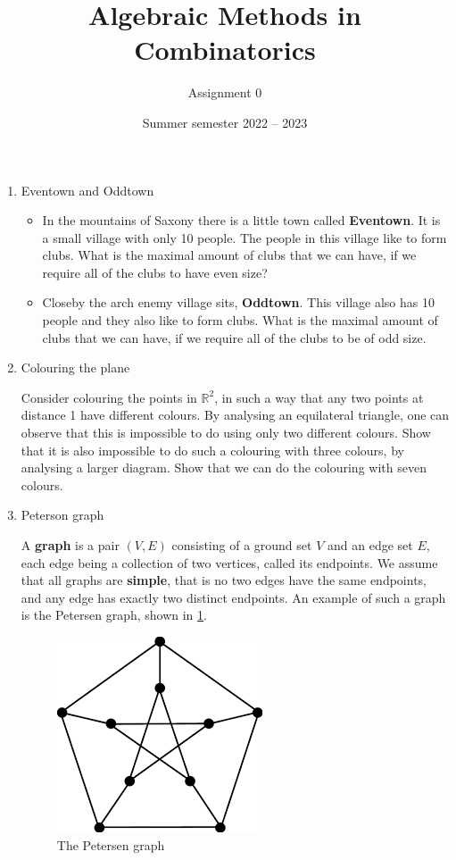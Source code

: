 \documentclass[kulak]{tplt}
\title{Algebraic Methods in Combinatorics}
\author{Assignment 0}
\date{Summer semester 2022 -- 2023}
\theoremstyle{definition}
\newcommand{\R}{\mathbb{R}}
\begin{document}
\maketitle
\begin{enumerate}
\item Eventown and Oddtown

\begin{itemize}
\item In the mountains of Saxony there is a little town called \textbf{Eventown}.
It is a small village with only 10 people.
The people in this village like to form clubs.
What is the maximal amount of clubs that we can have, if we require all of the clubs to have even size?

\item Closeby the arch enemy village sits, \textbf{Oddtown}.
This village also has 10 people and they also like to form clubs. 
What is the maximal amount of clubs that we can have, if we require all of the clubs to be of odd size.
\end{itemize}

\item Colouring the plane

Consider colouring the points in $\R^2$, in such a way that any two points at distance 1 have different colours.
By analysing an equilateral triangle, one can observe that this is impossible to do using only two different colours.
Show that it is also impossible to do such a colouring with three colours, by analysing a larger diagram. 
Show that we can do the colouring with seven colours.

\item Peterson graph

A \textbf{graph} is a pair $(V, E)$ consisting of a ground set $V$ and an edge set $E$, each edge being a collection of two vertices, called its endpoints.
We assume that all graphs are \textbf{simple}, that is no two edges have the same endpoints, and any edge has exactly two distinct endpoints.
An example of such a graph is the Petersen graph, shown in \cref{fig:pet}.

\begin{figure}[h]
\centering
\includegraphics[scale=0.5]{../imgs/petersen.png}
\caption{The Petersen graph\label{fig:pet}}
\end{figure}



\end{enumerate}
\end{document}
